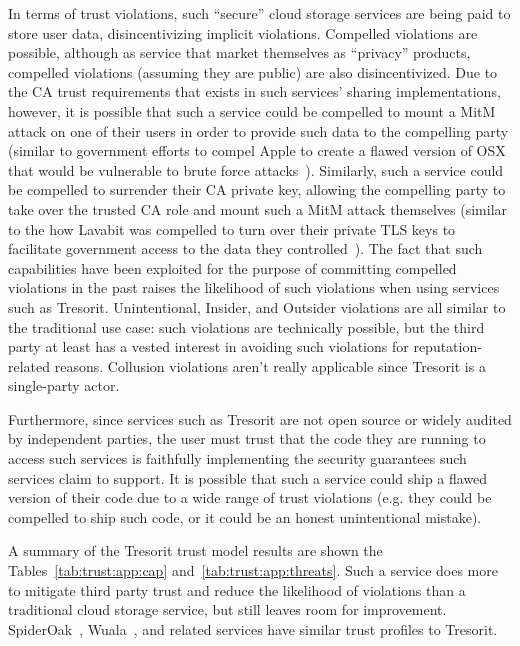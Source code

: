 In terms of trust violations, such ``secure'' cloud storage services
are being paid to store user data, disincentivizing implicit
violations. Compelled violations are possible, although as service
that market themselves as ``privacy'' products, compelled violations
(assuming they are public) are also disincentivized. Due to the CA
trust requirements that exists in such services' sharing
implementations, however, it is possible that such a service could be
compelled to mount a MitM attack on one of their users in order to
provide such data to the compelling party (similar to government
efforts to compel Apple to create a flawed version of OSX that would
be vulnerable to brute force attacks~\cite{ars-cookvfbi}). Similarly,
such a service could be compelled to surrender their CA private key,
allowing the compelling party to take over the trusted CA role and
mount such a MitM attack themselves (similar to the how Lavabit was
compelled to turn over their private TLS keys to facilitate government
access to the data they controlled~\cite{levsion-lavabit}). The fact
that such capabilities have been exploited for the purpose of
committing compelled violations in the past raises the likelihood of
such violations when using services such as Tresorit. Unintentional,
Insider, and Outsider violations are all similar to the traditional
use case: such violations are technically possible, but the third
party at least has a vested interest in avoiding such violations for
reputation-related reasons. Collusion violations aren't really
applicable since Tresorit is a single-party actor.

Furthermore, since services such as Tresorit are not open source or
widely audited by independent parties, the user must trust that the
code they are running to access such services is faithfully
implementing the security guarantees such services claim to
support. It is possible that such a service could ship a flawed
version of their code due to a wide range of trust violations
(e.g. they could be compelled to ship such code, or it could be an
honest unintentional mistake).

A summary of the Tresorit trust model results are shown the
Tables~\ref{tab:trust:app:cap} and~\ref{tab:trust:app:threats}. Such a
service does more to mitigate third party trust and reduce the
likelihood of violations than a traditional cloud storage service, but
still leaves room for improvement. SpiderOak~\cite{spideroak},
Wuala~\cite{wuala}, and related services have similar trust profiles
to Tresorit.

